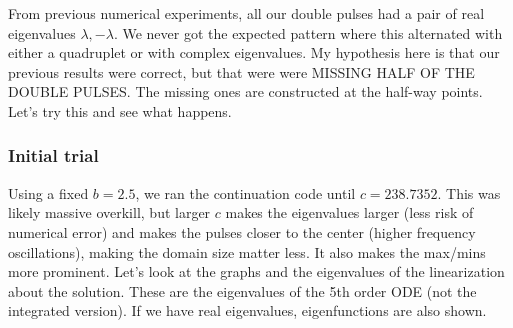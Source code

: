 \documentclass[12pt]{article}
\begin{document}
From previous numerical experiments, all our double pulses had a pair of real eigenvalues $\lambda, -\lambda$. We never got the expected pattern where this alternated with either a quadruplet or with complex eigenvalues. My hypothesis here is that our previous results were correct, but that were were MISSING HALF OF THE DOUBLE PULSES. The missing ones are constructed at the half-way points. Let's try this and see what happens.

\subsubsection*{Initial trial}
Using a fixed $b = 2.5$, we ran the continuation code until $c =  238.7352
$. This was likely massive overkill, but larger $c$ makes the eigenvalues larger (less risk of numerical error) and makes the pulses closer to the center (higher frequency oscillations), making the domain size matter less. It also makes the max/mins more prominent. Let's look at the graphs and the eigenvalues of the linearization about the solution. These are the eigenvalues of the 5th order ODE (not the integrated version). If we have real eigenvalues, eigenfunctions are also shown.
\end{document}

